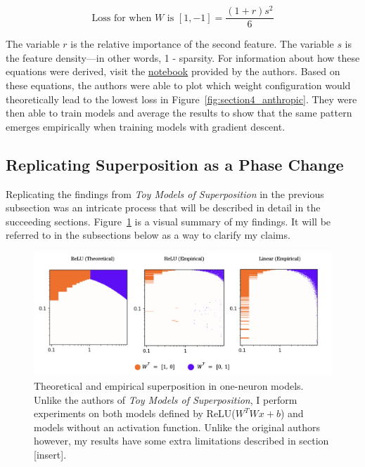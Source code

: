 \documentclass{article} %
\begin{document}
\begin{equation}
    \label{eq:loss3}
    \text{Loss for when  $W$ is $[1, -1]$} = \frac{(1 + r)s^2}{6}
\end{equation}

The variable $r$ is the relative importance of the second feature. The variable
$s$ is the feature density---in other words, 1 - sparsity. For information
about how these equations were derived, visit the
\href{https://github.com/wattenberg/superposition/blob/main/Exploring_Exact_Toy_Models.ipynb}{notebook} 
provided by the authors.
Based on these equations, the authors were able to plot which weight configuration
would theoretically lead to the lowest loss in Figure~\ref{fig:section4_anthropic}.
They were then able to train models and average the results to show that the
same pattern emerges empirically when training models with gradient descent.

\subsection{Replicating Superposition as a Phase Change}

Replicating the findings from \textit{Toy Models of Superposition} in the
previous subsection was an intricate process that will be described in detail in the
succeeding sections. Figure~\ref{fig:phase_changes_replication} is a visual
summary of my findings. It will be referred to in the subsections below as a
way to clarify my claims.

\begin{figure}[h]
    \centering
    \includegraphics[width=0.99\linewidth]{phase_changes/images/phase_changes_replication.png}
    \captionsetup{font=footnotesize, width=0.7\linewidth} %
    \caption{
        Theoretical and empirical superposition in one-neuron models. Unlike
        the authors of \textit{Toy Models of Superposition}, I perform experiments
        on both models defined by ReLU($W^TWx + b$) and models without an activation
        function. Unlike the original authors however, my results have some extra
        limitations described in section [insert].
    }
    \label{fig:phase_changes_replication}
\end{figure}
\end{document}
